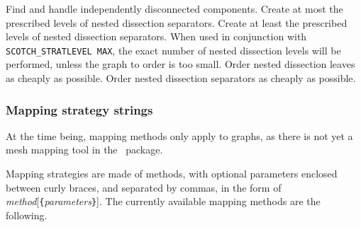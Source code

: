 \begin{itemize}
Find and handle independently disconnected components.
Create at most the prescribed levels of nested dissection separators.
Create at least the prescribed levels of nested dissection separators.
When used in conjunction with {\tt SCOTCH\_\lbt STRAT\lbt LEVEL\lbt
MAX}, the exact number of nested dissection levels will be performed,
unless the graph to order is too small.
Order nested dissection leaves as cheaply as possible.
Order nested dissection separators as cheaply as possible.
\end{itemize}

\subsubsection{Mapping strategy strings}
\label{sec-lib-format-strat-map}

At the time being, mapping methods only apply to graphs, as there is
not yet a mesh mapping tool in the \scotch\ package.

Mapping strategies are made of methods, with optional parameters enclosed
between curly braces, and separated by commas, in the form of
{\it method\/}{[{\tt \{}{\it parameters\/}{\tt \}}]}\enspace.
The currently available mapping methods are the following.

